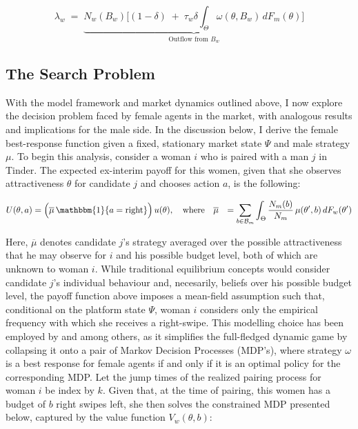 \begin{equation}\label{eq:ss3} 
    \lambda_w \;=\; \underbrace{N_w(B_w) \Big[ (1-\delta) \;+\; \tau_w \delta \int_{\Theta} \omega(\theta,B_w)\,dF_{m}(\theta) \Big]}_{\text{Outflow from $B_w$}}
\end{equation} 

\subsection{The Search Problem}\label{sec:section2.3}
With the model framework and market dynamics outlined above, I now explore the decision problem faced by female agents in the market, with analogous results and implications for the male side. In the discussion below, I derive the female best-response function given a fixed, stationary market state $\Psi$ and male strategy $\mu$. To begin this analysis, consider a woman $i$ who is paired with a man $j$ in Tinder. The expected ex-interim payoff for this women, given that she observes attractiveness $\theta$ for candidate $j$ and chooses action $a$, is the following:

\begin{equation*}
    \begin{aligned}
        U(\theta, a)&=\Big(\overline{\mu}\,\mathbbm{1}\{a=\text{right}\}\Big)\,u(\theta), \quad \text{where}\quad \overline{\mu} &= \sum_{b\in \mathcal{B}_m}\int_{\Theta}\frac{{N}_m(b)}{N_m}  \, \mu(\theta',b)\,dF_w(\theta')
    \end{aligned} 
\end{equation*}

Here, $\overline\mu$ denotes candidate $j$'s strategy averaged over the possible attractiveness that he may observe for $i$ and his possible budget level, both of which are unknown to woman $i$. While traditional equilibrium concepts would consider candidate $j$'s individual behaviour and, necesarily, beliefs over his possible budget level, the payoff function above imposes a mean-field assumption such that, conditional on the platform state $\Psi$, woman $i$ considers only the empirical frequency with which she receives a right-swipe. This modelling choice has been employed by \cite{immorlica2021designing} and \cite{iyer2014mean} among others, as it simplifies the full-fledged dynamic game by collapsing it onto a pair of Markov Decision Processes (MDP's), where strategy $\omega$ is a best response for female agents if and only if it is an optimal policy for the corresponding MDP. Let the jump times of the realized pairing process for woman $i$ be index by $k$. Given that, at the time of pairing, this women has a budget of $b$ right swipes left, she then solves the constrained MDP presented below, captured by the value function $V_w(\theta,b)$:


